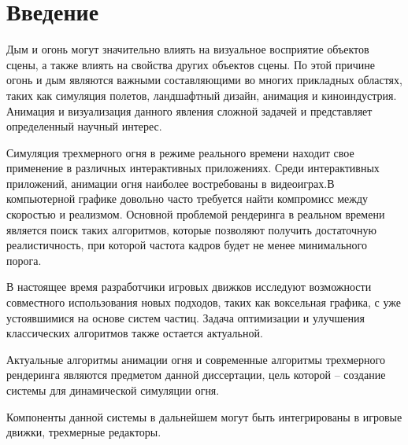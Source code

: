 \part*{Введение}

Дым и огонь могут значительно влиять на визуальное восприятие объектов сцены, а
также влиять на свойства других объектов сцены. По этой причине огонь и дым
являются важными составляющими во многих прикладных областях, таких как
симуляция полетов, ландшафтный дизайн, анимация и киноиндустрия. Анимация и
визуализация данного явления сложной задачей и представляет определенный научный
интерес.

Симуляция трехмерного огня в режиме реального времени находит свое применение в
различных интерактивных приложениях.  Среди интерактивных приложений, анимации
огня наиболее востребованы в видеоиграх.В компьютерной графике
довольно часто требуется найти компромисс между скоростью и реализмом. Основной
проблемой рендеринга в реальном времени является поиск таких алгоритмов, которые
позволяют получить достаточную реалистичность, при которой частота кадров будет
не менее минимального порога.

В настоящее время разработчики игровых движков исследуют возможности
совместного использования новых подходов, таких как воксельная графика, с уже
устоявшимися на основе систем частиц. Задача оптимизации и улучшения
классических алгоритмов также остается актуальной.

Актуальные алгоритмы анимации огня и современные алгоритмы трехмерного
рендеринга являются предметом данной диссертации, цель которой -- создание
системы для динамической симуляции огня.

Компоненты данной системы в дальнейшем могут быть интегрированы в игровые
движки, трехмерные редакторы.
